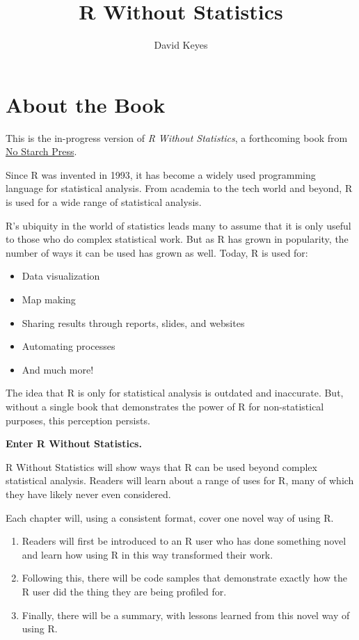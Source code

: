 \documentclass[
]{book}
\title{R Without Statistics}
\author{David Keyes}
\date{}
\begin{document}
\maketitle

{
\setcounter{tocdepth}{1}
\tableofcontents
}
\hypertarget{about-the-book}{%
\chapter*{About the Book}\label{about-the-book}}

This is the in-progress version of \emph{R Without Statistics}, a forthcoming book from \href{https://www.nostarch.com/}{No Starch Press}.

Since R was invented in 1993, it has become a widely used programming language for statistical analysis. From academia to the tech world and beyond, R is used for a wide range of statistical analysis.

R's ubiquity in the world of statistics leads many to assume that it is only useful to those who do complex statistical work. But as R has grown in popularity, the number of ways it can be used has grown as well. Today, R is used for:

\begin{itemize}
\item
  Data visualization
\item
  Map making
\item
  Sharing results through reports, slides, and websites
\item
  Automating processes
\item
  And much more!
\end{itemize}

The idea that R is only for statistical analysis is outdated and inaccurate. But, without a single book that demonstrates the power of R for non-statistical purposes, this perception persists.

\textbf{Enter R Without Statistics.}

R Without Statistics will show ways that R can be used beyond complex statistical analysis. Readers will learn about a range of uses for R, many of which they have likely never even considered.

Each chapter will, using a consistent format, cover one novel way of using R.

\begin{enumerate}
\def\labelenumi{\arabic{enumi}.}
\item
  Readers will first be introduced to an R user who has done something novel and learn how using R in this way transformed their work.
\item
  Following this, there will be code samples that demonstrate exactly how the R user did the thing they are being profiled for.
\item
  Finally, there will be a summary, with lessons learned from this novel way of using R.
\end{enumerate}
\end{document}

